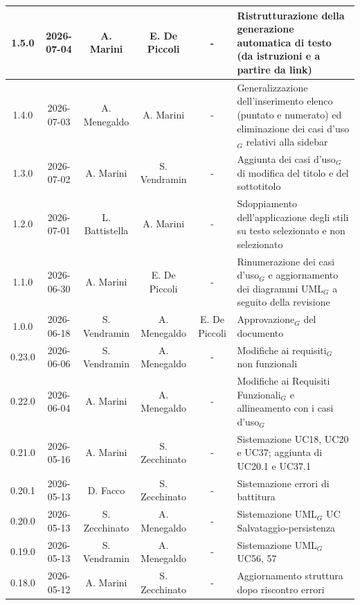 \documentclass[a4paper, 10pt]{article}
\begin{document}
\begin{longtable}{|c|c|c|c|c|p{3cm}|}
    1.5.0 & 2026-07-04 & A. Marini & E. De Piccoli & - & Ristrutturazione della generazione automatica di testo (da istruzioni e a partire da link)\\ \hline

    1.4.0 & 2026-07-03 & A. Menegaldo & A. Marini & - & Generalizzazione dell'inserimento elenco (puntato e numerato) ed eliminazione dei casi d'uso$_G$ relativi alla sidebar\\ \hline

    1.3.0 & 2026-07-02 & A. Marini & S. Vendramin & - & Aggiunta dei casi d'uso$_G$ di modifica del titolo e del sottotitolo\\ \hline

    1.2.0 & 2026-07-01 & L. Battistella & A. Marini & - & Sdoppiamento dell'applicazione degli stili su testo selezionato e non selezionato\\ \hline

    1.1.0 & 2026-06-30 & A. Marini & E. De Piccoli & - & Rinumerazione dei casi d'uso$_G$ e aggiornamento dei diagrammi UML$_G$ a seguito della revisione\\ \hline

    1.0.0 & 2026-06-18 & S. Vendramin & A. Menegaldo & E. De Piccoli & Approvazione$_G$ del documento\\ \hline

    0.23.0 & 2026-06-06 & S. Vendramin & A. Menegaldo & - & Modifiche ai requisiti$_G$ non funzionali \\ \hline

    0.22.0 & 2026-06-04 & A. Marini & A. Menegaldo & - & Modifiche ai Requisiti Funzionali$_G$ e allineamento con i casi d'uso$_G$\\ \hline

    0.21.0 & 2026-05-16 & A. Marini & S. Zecchinato & - & Sistemazione UC18, UC20 e UC37; aggiunta di UC20.1 e UC37.1\\ \hline

    0.20.1 & 2026-05-13 & D. Facco & S. Zecchinato & - & Sistemazione errori di battitura\\ \hline

    0.20.0 & 2026-05-13 & S. Zecchinato & A. Menegaldo & - & Sistemazione UML$_G$ UC Salvataggio-persistenza\\ \hline

    0.19.0 & 2026-05-13 & S. Vendramin & A. Menegaldo & - & Sistemazione UML$_G$ UC56, 57\\ \hline

    0.18.0 & 2026-05-12 & A. Marini & S. Zecchinato & - & Aggiornamento struttura dopo riscontro errori\\ \hline


\end{longtable}
\end{document}
